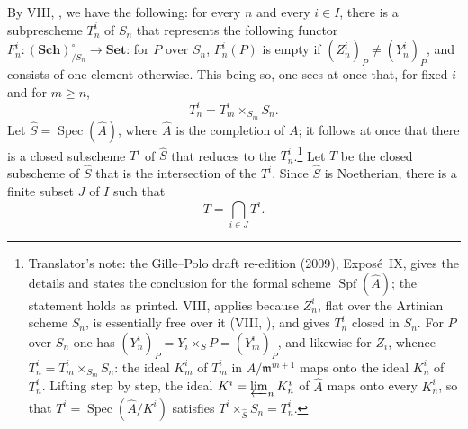 By VIII, , we have the following:
for every \(n\) and every \(i\in I\), there is a subprescheme \(T_n^i\) of
\(S_n\) that represents the following functor
\(F_n^i:(\mathbf{Sch})_{/S_n}^{\circ}\to\mathbf{Set}\): for \(P\) over
\(S_n\), \(F_n^i(P)\) is empty if \((Z_n^i)_P\ne(Y_n^i)_P\), and consists
of one element otherwise. This being so, one sees at once that, for fixed
\(i\) and for \(m\geq n\),
\[
  T_n^i=T_m^i\times_{S_m}S_n.
\]
Let \(\widehat S=\operatorname{Spec}(\widehat A)\), where \(\widehat A\)
is the completion of \(A\); it follows at once that there is a closed
subscheme \(T^i\) of \(\widehat S\) that reduces to the \(T_n^i\).\footnote{Translator's
note: the Gille--Polo draft re-edition (2009), Expos\'e~IX, gives the
details and states the conclusion for the formal scheme
\(\operatorname{Spf}(\widehat A)\); the statement holds as printed.
VIII,  applies because \(Z_n^i\),
flat over the Artinian scheme \(S_n\), is essentially free over it
(VIII, ), and
gives \(T_n^i\) closed in \(S_n\). For \(P\) over \(S_n\) one has
\((Y_n^i)_P=Y_i\times_SP=(Y_m^i)_P\), and likewise for \(Z_i\), whence
\(T_n^i=T_m^i\times_{S_m}S_n\): the ideal \(K_m^i\) of \(T_m^i\) in
\(A/\mathfrak m^{m+1}\) maps onto the ideal \(K_n^i\) of \(T_n^i\).
Lifting step by step, the ideal \(K^i=\varprojlim_nK_n^i\) of
\(\widehat A\) maps onto every \(K_n^i\), so that
\(T^i=\operatorname{Spec}(\widehat A/K^i)\) satisfies
\(T^i\times_{\widehat S}S_n=T_n^i\).}
Let \(T\) be the closed subscheme of \(\widehat S\) that is the
intersection of the \(T^i\). Since \(\widehat S\) is Noetherian, there is
a finite subset \(J\) of \(I\) such that
\[
  T=\bigcap_{i\in J}T^i.
\]

